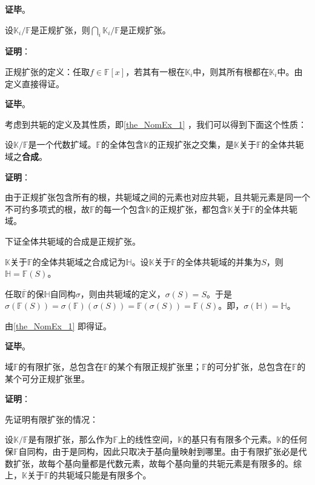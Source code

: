 \textbf{证毕}。


\begin{theorem}{}\label{the_NomEx_2}
设$\mathbb{K}_i/\mathbb{F}$是正规扩张，则$\bigcap_{i}\mathbb{K}_i/\mathbb{F}$是正规扩张。
\end{theorem}

\textbf{证明}：

正规扩张的定义：任取$f\in\mathbb{F}[x]$，若其有一根在$\mathbb{K}_i$中，则其所有根都在$\mathbb{K}_i$中。由定义直接得证。

\textbf{证毕}。


考虑到共轭的定义及其性质，即\autoref{the_NomEx_1} ，我们可以得到下面这个性质：

\begin{theorem}{}\label{the_NomEx_3}
设$\mathbb{K}/\mathbb{F}$是一个代数扩域。$\mathbb{F}$的全体包含$\mathbb{K}$的正规扩张之交集，是$\mathbb{K}$关于$\mathbb{F}$的全体共轭域之\textbf{合成}。
\end{theorem}

\textbf{证明}：

由于正规扩张包含所有的根，共轭域之间的元素也对应共轭，且共轭元素是同一个不可约多项式的根，故$\mathbb{F}$的每一个包含$\mathbb{K}$的正规扩张，都包含$\mathbb{K}$关于$\mathbb{F}$的全体共轭域。

下证全体共轭域的合成是正规扩张。

$\mathbb{K}$关于$\mathbb{F}$的全体共轭域之合成记为$\mathbb{H}$。设$\mathbb{K}$关于$\mathbb{F}$的全体共轭域的并集为$S$，则$\mathbb{H}=\mathbb{F}(S)$。

任取$\overline{\mathbb{F}}$的保$\mathbb{H}$自同构$\sigma$，则由共轭域的定义，$\sigma(S)=S$。于是$\sigma(\mathbb{F}(S))=\sigma(\mathbb{F})(\sigma(S))=\mathbb{F}(\sigma(S))=\mathbb{F}(S)$。即，$\sigma(\mathbb{H})=\mathbb{H}$。

由\autoref{the_NomEx_1} 即得证。

\textbf{证毕}。


\begin{theorem}{}\label{the_NomEx_4}
域$\mathbb{F}$的有限扩张，总包含在$\mathbb{F}$的某个有限正规扩张里；$\mathbb{F}$的可分扩张，总包含在$\mathbb{F}$的某个可分正规扩张里。
\end{theorem}

\textbf{证明}：

先证明有限扩张的情况：

设$\mathbb{K}/\mathbb{F}$是有限扩张，那么作为$\mathbb{F}$上的线性空间，$\mathbb{K}$的基只有有限多个元素。$\mathbb{K}$的任何保$\mathbb{F}$自同构，由于是同构，因此只取决于基向量映射到哪里。由于有限扩张必是代数扩张，故每个基向量都是代数元素，故每个基向量的共轭元素是有限多的。综上，$\mathbb{K}$关于$\mathbb{F}$的共轭域只能是有限多个。


